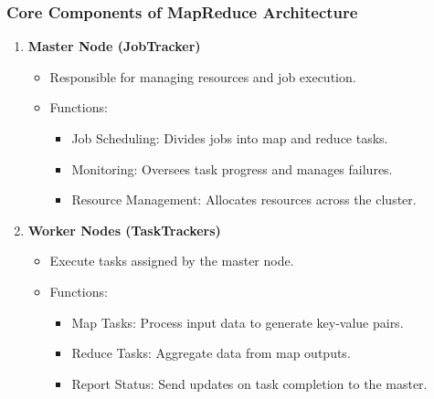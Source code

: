 \documentclass[aspectratio=169]{beamer}
\begin{document}
\begin{frame}[fragile]
    \frametitle{Core Components of MapReduce Architecture}
    \begin{enumerate}
        \item \textbf{Master Node (JobTracker)}
        \begin{itemize}
            \item Responsible for managing resources and job execution.
            \item Functions:
            \begin{itemize}
                \item Job Scheduling: Divides jobs into map and reduce tasks.
                \item Monitoring: Oversees task progress and manages failures.
                \item Resource Management: Allocates resources across the cluster.
            \end{itemize}
        \end{itemize}
        
        \item \textbf{Worker Nodes (TaskTrackers)}
        \begin{itemize}
            \item Execute tasks assigned by the master node.
            \item Functions:
            \begin{itemize}
                \item Map Tasks: Process input data to generate key-value pairs.
                \item Reduce Tasks: Aggregate data from map outputs.
                \item Report Status: Send updates on task completion to the master.
            \end{itemize}
        \end{itemize}
    \end{enumerate}
\end{frame}
\end{document}
